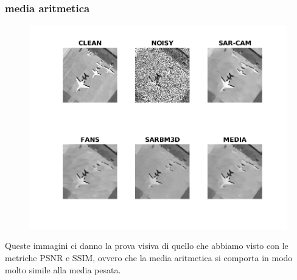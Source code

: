 \subsubsection{media aritmetica}
\begin{figure}[H]
    \centering
    \includegraphics[width=1.1\textwidth]{utils/MNairplane00.png}
    \caption{}
    \label{fig:airplane00MN}
  \end{figure}
Queste immagini ci danno la prova visiva di quello che abbiamo visto con le metriche PSNR e SSIM, 
ovvero che la media aritmetica si comporta in modo molto simile alla media pesata.